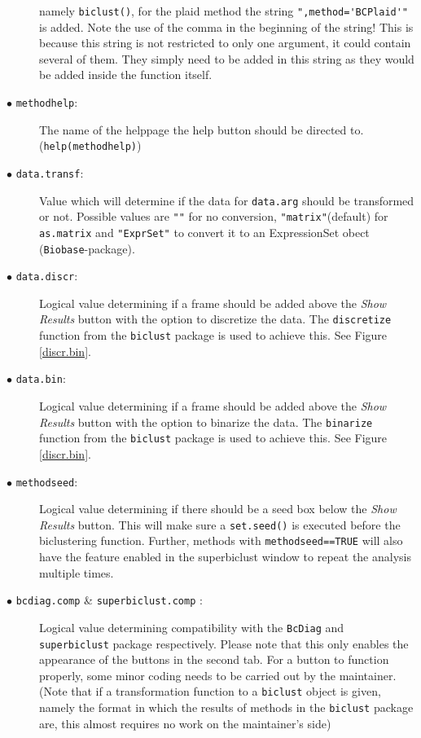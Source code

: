 \documentclass[a4paper]{article}\usepackage[]{graphicx}\usepackage[]{color}
\begin{document}
\begin{description}
namely \verb|biclust()|, for the plaid method the string
\verb|",method='BCPlaid'"| is added. Note the use of the comma in the beginning of the string! This is
because this string is not restricted to only one argument, it could contain
several of them. They simply need to be added in this string as they would
be added inside the function itself.  
  \item[$\bullet$ \texttt{methodhelp}:] The name of the helppage the help button
  should be directed to. (\verb|help(methodhelp)|)
  \item[$\bullet$ \texttt{data.transf}:] Value which will determine if the data
  for \verb|data.arg| should be transformed or not. Possible values are
  \verb|""| for no conversion, \verb|"matrix"|(default) for \verb|as.matrix| and
  \verb|"ExprSet"| to convert it to an ExpressionSet obect
  (\texttt{Biobase}-package).
    \item[$\bullet$ \texttt{data.discr}:] Logical value determining if a frame
  should be added above the {\it Show Results} button with the option to
  discretize the data. The \verb|discretize| function from the \verb|biclust|
  package is used to achieve this. See Figure \ref{discr.bin}.
  
  \item[$\bullet$ \texttt{data.bin}:] Logical value determining if a frame
  should be added above the {\it Show Results} button with the option to
  binarize the data. The \verb|binarize| function from the \verb|biclust|
  package is used to achieve this. See Figure \ref{discr.bin}.
  
  \item[$\bullet$ \texttt{methodseed}:] Logical value determining if there
  should be a seed box below the {\it Show Results} button. This will make sure
  a \verb|set.seed()| is executed before the biclustering function. Further,
  methods with \texttt{methodseed==TRUE} will also have the feature enabled in
  the superbiclust window to repeat the analysis multiple times.
  
  \item[$\bullet$ \texttt{bcdiag.comp} \& \texttt{superbiclust.comp} :] Logical
  value determining compatibility with the \verb|BcDiag| and \verb|superbiclust|
  package respectively. Please note that this only enables the appearance of the
  buttons in the second tab. For a button to function properly, some minor
  coding needs to be carried out by the maintainer.\\
  (Note that if a transformation function to a \verb|biclust| object is given,
  namely the format in which the results of methods in the \verb|biclust|
  package are, this almost requires no work on the maintainer's side)
  
\end{description}
\end{document}
